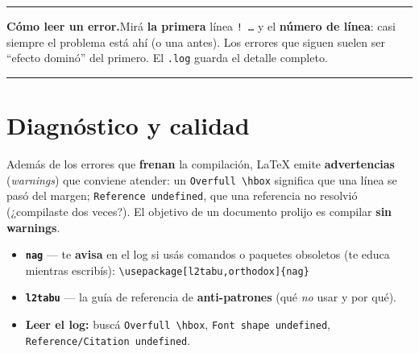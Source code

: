 \documentclass[11pt,a4paper]{article}
\newenvironment{nota}{\par\smallskip\noindent\begin{center}%
  \begin{minipage}{0.95\linewidth}\small\rule{\linewidth}{0.4pt}\par\nobreak}%
  {\par\rule{\linewidth}{0.4pt}\end{minipage}\end{center}\smallskip}
\begin{document}
\begin{nota}
\textbf{Cómo leer un error.}\enspace Mirá \textbf{la primera} línea
\texttt{! \dots} y el \textbf{número de línea}: casi siempre el problema está ahí
(o una antes). Los errores que siguen suelen ser \enquote{efecto dominó} del
primero. El \texttt{.log} guarda el detalle completo.
\end{nota}

\section{Diagnóstico y calidad}
Además de los errores que \textbf{frenan} la compilación, \LaTeX{} emite
\textbf{advertencias} (\emph{warnings}) que conviene atender: un
\texttt{Overfull \textbackslash hbox} significa que una línea se pasó del margen;
\texttt{Reference undefined}, que una referencia no resolvió (¿compilaste dos
veces?). El objetivo de un documento prolijo es compilar \textbf{sin warnings}.

\begin{itemize}[noitemsep]
  \item \textbf{\texttt{nag}} — te \textbf{avisa} en el log si usás comandos o
        paquetes obsoletos (te educa mientras escribís):
        \lstinline[style=tex]|\usepackage[l2tabu,orthodox]{nag}|
  \item \textbf{\texttt{l2tabu}} — la guía de referencia de \textbf{anti-patrones}
        (qué \emph{no} usar y por qué).
  \item \textbf{Leer el log:} buscá \texttt{Overfull \textbackslash hbox},
        \texttt{Font shape undefined}, \texttt{Reference/Citation undefined}.
\end{itemize}

\end{document}
